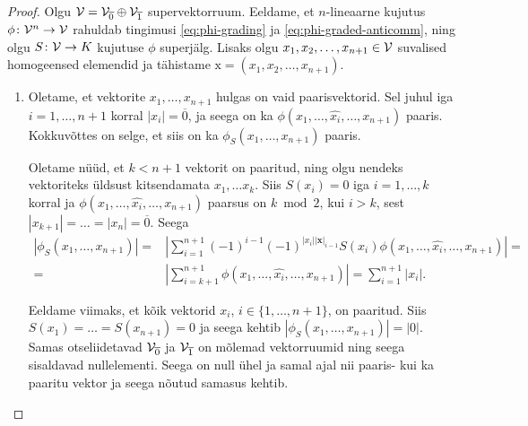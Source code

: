 \begin{proof}
    Olgu $\mathcal{V} = \mathcal{V}_{\overline{0}} \oplus \mathcal{V}_{\overline{1}}$ supervektorruum.
    Eeldame, et $n$-lineaarne kujutus $\phi \colon \mathcal{V}^n \to \mathcal{V}$ rahuldab
    tingimusi \eqref{eq:phi-grading} ja \eqref{eq:phi-graded-anticomm}, ning
    olgu $S \colon \mathcal{V} \to K$ kujutuse $\phi$ superjälg. Lisaks olgu
    $x_1, x_2, \dots, x_{n+1} \in \mathcal{V}$ suvalised homogeensed elemendid
    ja tähistame $\mathrm{x} = (x_1, x_2, \dots, x_{n+1})$.
    \begin{enumerate}[label=\arabic*)]
        \item Oletame, et vektorite $x_1, \dots, x_{n+1}$ hulgas on vaid
            paarisvektorid. Sel juhul iga $i = 1, \dots, n+1$ korral
            $|x_i| = \overline{0}$, ja seega on ka
            $\phi(x_1, \dots, \hat{x_i}, \dots, x_{n+1})$ paaris. Kokkuvõttes
            on selge, et siis on ka $\phi_S(x_1, \dots, x_{n+1})$ paaris.

            Oletame nüüd, et $k < n + 1$ vektorit on paaritud, ning
            olgu nendeks vektoriteks üldsust kitsendamata $x_{1}, \dots x_{k}$.
            Siis $S(x_{i}) = 0$ iga $i = 1, \dots, k$ korral ja
            $\phi(x_1, \dots, \hat{x_i}, \dots, x_{n+1})$ paarsus on
            $k \bmod{2}$, kui $i > k$, sest
            $|x_{k+1}| = \dots = |x_n| = \overline{0}$.
            Seega
            \begin{align*}
                | \phi_S (x_1, \dots, x_{n+1}) | =&
                \left |
                    \sum_{i=1}^{n+1} (-1)^{i-1}(-1)^{
                        |x_i| |\mathbf{x}|_{i-1}
                    } S(x_i) \phi \left(
                        x_1, \dots, \hat{x_i}, \dots, x_{n+1}
                    \right)
                \right| = \\
                =& \left| \sum_{i=k+1}^{n+1}
                    \phi \left( x_1, \dots, \hat{x_i}, \dots, x_{n+1} \right)
                \right| = \sum_{i=1}^{n+1} |x_i|.
            \end{align*}

            Eeldame viimaks, et kõik vektorid $x_i$, $i \in \{1, \dots, n+1\}$,
            on paaritud. Siis $S(x_1) = \dots = S(x_{n+1}) = 0$ ja seega kehtib
            $| \phi_S (x_1, \dots, x_{n+1}) | = |0|$. Samas otseliidetavad
            $\mathcal{V}_{\overline{0}}$ ja $\mathcal{V}_{\overline{1}}$ on mõlemad vektorruumid
            ning seega sisaldavad nullelementi. Seega on null ühel ja samal
            ajal nii paaris- kui ka paaritu vektor ja seega nõutud samasus
            kehtib.


\end{enumerate}
\end{proof}
